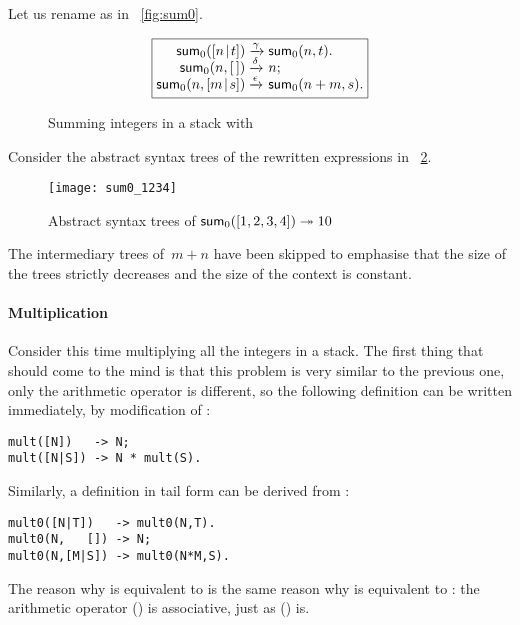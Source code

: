 Let us rename  as  in
\fig~\vref{fig:sum0}.
\begin{figure}
\begin{equation*}
\boxed{%
\begin{array}{@{}r@{\;}l@{\;}l@{}}
\fun{sum}_0(\cons{n}{t}) & \xrightarrow{\smash{\gamma}}
                         & \fun{sum}_0(n,t).\\
      \fun{sum}_0(n,\el) & \xrightarrow{\smash{\delta}} & n;\\
\fun{sum}_0(n,\cons{m}{s}) & \xrightarrow{\smash{\epsilon}}
                           & \fun{sum}_0(n+m,s).
\end{array}}
\end{equation*}
\caption{Summing integers in a stack with 
\label{fig:sum0}}
\end{figure}
Consider the abstract syntax trees of the rewritten
expressions in \fig~\ref{fig:sum0_1234}.
\begin{figure}
\centering
\texttt{[image: sum0\_1234]}
\caption{Abstract syntax trees of \(\textsf{sum}_0([1,2,3,4])
  \twoheadrightarrow 10\)\label{fig:sum0_1234}}
\end{figure}
The intermediary trees of~\(m+n\) have been skipped to emphasise that
the size of the trees strictly decreases and the size of the context
is constant.

\paragraph{Multiplication}

Consider this time multiplying all the integers in a stack. The first
thing that should come to the mind is that this problem is very
similar to the previous one, only the arithmetic operator is
different, so the following definition can be written immediately, by
modification of :
\begin{verbatim}
mult([N])   -> N;
mult([N|S]) -> N * mult(S).
\end{verbatim}
Similarly, a definition in tail form can be derived from
:
\begin{verbatim}
mult0([N|T])   -> mult0(N,T).
mult0(N,   []) -> N;
mult0(N,[M|S]) -> mult0(N*M,S).
\end{verbatim}
The reason why  is equivalent to  is
the same reason why  is equivalent to :
the arithmetic operator (\erlcode{*}) is associative, just as
(\erlcode{+}) is.

